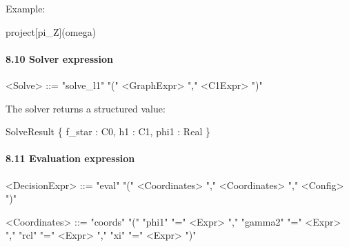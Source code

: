 \documentclass[
]{article}
\newenvironment{Shaded}{\begin{snugshade}}{\end{snugshade}}
\newcommand{\NormalTok}[1]{\textcolor[rgb]{0.12,0.11,0.11}{#1}}
\begin{document}
Example:

\begin{Shaded}
\begin{Highlighting}[]
\NormalTok{project[pi\_Z](omega)}
\end{Highlighting}
\end{Shaded}

\paragraph{8.10 Solver expression}\label{solver-expression}

\begin{Shaded}
\begin{Highlighting}[]
\NormalTok{\textless{}Solve\textgreater{} ::= "solve\_l1" "(" \textless{}GraphExpr\textgreater{} "," \textless{}C1Expr\textgreater{} ")"}
\end{Highlighting}
\end{Shaded}

The solver returns a structured value:

\begin{Shaded}
\begin{Highlighting}[]
\NormalTok{SolveResult \{}
\NormalTok{    f\_star : C0,}
\NormalTok{    h1     : C1,}
\NormalTok{    phi1   : Real}
\NormalTok{\}}
\end{Highlighting}
\end{Shaded}

\paragraph{8.11 Evaluation expression}\label{evaluation-expression}

\begin{Shaded}
\begin{Highlighting}[]
\NormalTok{\textless{}DecisionExpr\textgreater{} ::=}
\NormalTok{    "eval" "(" \textless{}Coordinates\textgreater{} "," \textless{}Coordinates\textgreater{} "," \textless{}Config\textgreater{} ")"}

\NormalTok{\textless{}Coordinates\textgreater{} ::=}
\NormalTok{    "coords" "("}
\NormalTok{        "phi1" "=" \textless{}Expr\textgreater{} ","}
\NormalTok{        "gamma2" "=" \textless{}Expr\textgreater{} ","}
\NormalTok{        "rcl" "=" \textless{}Expr\textgreater{} ","}
\NormalTok{        "xi" "=" \textless{}Expr\textgreater{}}
\NormalTok{    ")"}
\end{Highlighting}
\end{Shaded}
\end{document}
